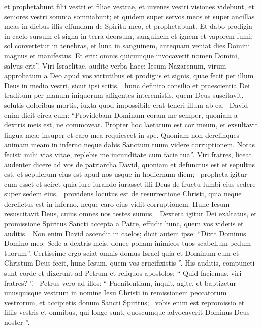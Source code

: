 \begin{biblechapter}
\begin{biblechapter}
 et prophetabunt filii vestri et filiae vestrae,
 et iuvenes vestri visiones videbunt,
 et seniores vestri somnia somniabunt;
 \verse et quidem super servos meos et super ancillas meas
 in diebus illis effundam de Spiritu meo,
 et prophetabunt.
 \verse Et dabo prodigia in caelo sursum et signa in terra deorsum,
 sanguinem et ignem et vaporem fumi;
 \verse sol convertetur in tenebras,
 et luna in sanguinem,
 antequam veniat dies Domini
 magnus et manifestus.
 \verse Et erit:
 omnis quicumque invocaverit nomen Domini, salvus erit”.
 \verse Viri Israelitae, audite verba haec: Iesum Nazarenum, virum approbatum a Deo apud vos virtutibus et prodigiis et signis, quae fecit per illum Deus in medio vestri, sicut ipsi scitis, 
 \verse hunc definito consilio et praescientia Dei traditum per manum iniquorum affigentes interemistis,
\verse quem Deus suscitavit, solutis doloribus mortis, iuxta quod impossibile erat teneri illum ab ea. 
 \verse David enim dicit circa eum:
 “Providebam Dominum coram me semper, quoniam a dextris meis est, ne commovear.
 \verse Propter hoc laetatum est cor meum,
 et exsultavit lingua mea;
 insuper et caro mea requiescet in spe.
 \verse Quoniam non derelinques animam meam in inferno
 neque dabis Sanctum tuum videre corruptionem.
 \verse Notas fecisti mihi vias vitae,
 replebis me iucunditate cum facie tua”.
 \verse Viri fratres, liceat audenter dicere ad vos de patriarcha David, quoniam et defunctus est et sepultus est, et sepulcrum eius est apud nos usque in hodiernum diem; 
 \verse propheta igitur cum esset et sciret quia iure iurando iurasset illi Deus de fructu lumbi eius sedere super sedem eius, 
 \verse providens locutus est de resurrectione Christi, quia neque derelictus est in inferno, neque caro eius vidit corruptionem.
 \verse Hunc Iesum resuscitavit Deus, cuius omnes nos testes sumus. 
 \verse Dextera igitur Dei exaltatus, et promissione Spiritus Sancti accepta a Patre, effudit hunc, quem vos videtis et auditis. 
 \verse Non enim David ascendit in caelos; dicit autem ipse:
 “Dixit Dominus Domino meo: Sede a dextris meis,
 \verse donec ponam inimicos tuos scabellum pedum tuorum”.
 \verse Certissime ergo sciat omnis domus Israel quia et Dominum eum et Christum Deus fecit, hunc Iesum, quem vos crucifixistis ”.
 \verse His auditis, compuncti sunt corde et dixerunt ad Petrum et reliquos apostolos: “ Quid faciemus, viri fratres? ”. 
 \verse Petrus vero ad illos: “ Paenitentiam, inquit, agite, et baptizetur unusquisque vestrum in nomine Iesu Christi in remissionem peccatorum vestrorum, et accipietis donum Sancti Spiritus; 
 \verse vobis enim est repromissio et filiis vestris et omnibus, qui longe sunt, quoscumque advocaverit Dominus Deus noster ”. 

\end{biblechapter}
\end{biblechapter}
